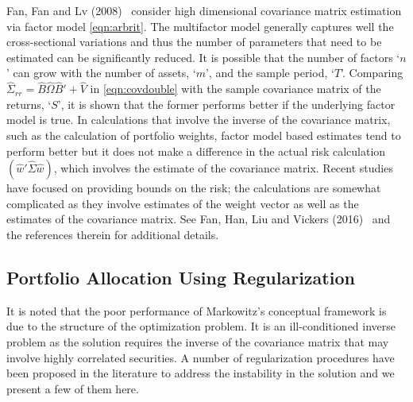 Fan, Fan and Lv (2008)~\cite{fansq} consider high dimensional covariance matrix estimation via factor model \eqref{eqn:arbrit}. The multifactor model generally captures well the cross-sectional variations and thus the number of parameters that need to be estimated can be significantly reduced. It is possible that the number of factors `$n$' can grow with the number of assets, `$m$', and the sample period, `$T$'. Comparing $\hat{\Sigma}_{rr}= \hat{B} \hat{\Omega} \hat{B}' + \hat{V}$ in \eqref{eqn:covdouble} with the sample covariance matrix of the returns, `$S$', it is shown that the former performs better if the underlying factor model is true. In calculations that involve the inverse of the covariance matrix, such as the calculation of portfolio weights, factor model based estimates tend to perform better but it does not make a difference in the actual risk calculation $(\hat{w}' \hat{\Sigma} \hat{w})$, which involves the estimate of the covariance matrix. Recent studies have focused on providing bounds on the risk; the calculations are somewhat complicated as they involve estimates of the weight vector as well as the estimates of the covariance matrix. See Fan, Han, Liu and Vickers (2016)~\cite{vickers} and the references therein for additional details.


\subsection{Portfolio Allocation Using Regularization}

It is noted that the poor performance of Markowitz's conceptual framework is due to the structure of the optimization problem. It is an ill-conditioned inverse problem as the solution requires the inverse of the covariance matrix that may involve highly correlated securities. A number of regularization procedures have been proposed in the literature to address the instability in the solution and we present a few of them here. \twomedskip


